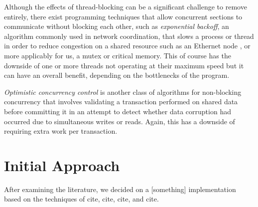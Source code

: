 \documentclass[11pt, a4paper, twocolumn]{article}
\begin{document}
Although the effects of thread-blocking can be a significant challenge to remove entirely, there exist programming techniques that allow concurrent sections to communicate without blocking each other, such as \emph{exponential backoff}, an algorithm commonly used in network coordination, that slows a process or thread in order to reduce congestion on a shared resource such as an Ethernet node \citep{Goodman2019}, or more applicably for us, a mutex or critical memory. This of course has the downside of one or more threads not operating at their maximum speed but it can have an overall benefit, depending on the bottlenecks of the program.

\emph{Optimistic concurrency control} is another class of algorithms for non-blocking concurrency that involves validating a transaction performed on shared data before committing it \citep{Herlihy1993} in an attempt to detect whether data corruption had occurred due to simultaneous writes or reads. Again, this has a downside of requiring extra work per transaction.



\section{Initial Approach}

After examining the literature, we decided on a [something] implementation based on the techniques of cite, cite, cite, and cite.





\end{document}
